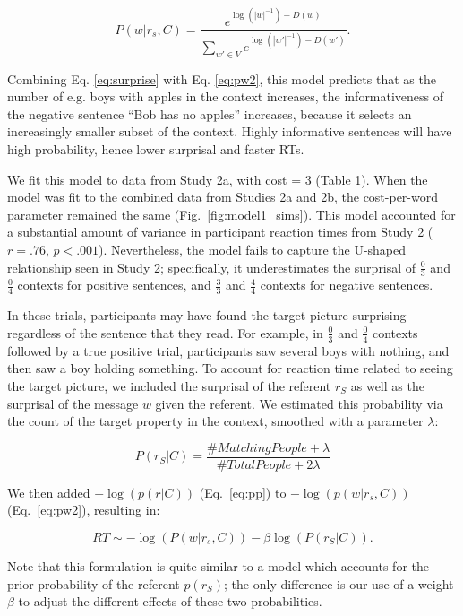 \documentclass[10pt,letterpaper]{article}
\begin{document}
\begin{equation}\label{eq:pw2}
P(w | r_s, C) = \frac{ e^{\log(|w|^{-1}) - D(w)}} {\sum_{w' \in V}{e^{\log(|w'|^{-1}) - D(w')}}}.
\end{equation}

\noindent Combining Eq. \ref{eq:surprise} with Eq. \ref{eq:pw2}, this model predicts that as the number of e.g. boys with apples in the context increases, the informativeness of the negative sentence ``Bob has no apples'' increases, because it selects an increasingly smaller subset of the context. Highly informative sentences will have high probability, hence lower surprisal and faster RTs. 

We fit this model to data from Study 2a, with cost = 3 (Table 1).  When the model was fit to the combined data from Studies 2a and 2b, the cost-per-word parameter remained the same (Fig.\ \ref{fig:model1_sims}).  This model accounted for a substantial amount of variance in participant reaction times from Study 2 ($r=.76$, $p<.001$).  Nevertheless, the model fails to capture the U-shaped relationship seen in Study 2; specifically, it underestimates the surprisal of $\frac{0}{3}$ and $\frac{0}{4}$ contexts for positive sentences, and $\frac{3}{3}$ and $\frac{4}{4}$ contexts for negative sentences.

In these trials, participants may have found the target picture surprising regardless of the sentence that they read. For example, in $\frac{0}{3}$ and $\frac{0}{4}$ contexts followed by a true positive trial, participants saw several boys with nothing, and then saw a boy holding something.  To account for reaction time related to seeing the target picture, we included the surprisal of the referent $r_S$ as well as the surprisal of the message $w$ given the referent. We estimated this probability via the count of the target property in the context, smoothed with a parameter $\lambda$:

\begin{equation}\label{eq:pp}
P(r_S | C) =  \frac{\# Matching People  + \lambda}{\# Total People + 2\lambda}
\end{equation}

We then added $-\log(p(r|C))$ (Eq.\ \ref{eq:pp}) to $-\log(p(w|r_s,C))$ (Eq.\ \ref{eq:pw2}), resulting in:

\begin{equation}\label{eq:total}
RT \sim - \log(P(w|r_s, C)) - \beta \log(P(r_S|C)).
\end{equation}

\noindent Note that this formulation is quite similar to a model which accounts for the prior probability of the referent $p(r_S)$; the only difference is our use of a weight $\beta$ to adjust the different effects of these two probabilities.  
\end{document}
